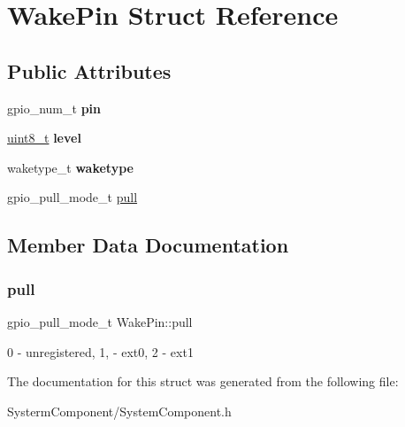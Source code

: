 \hypertarget{structWakePin}{}\section{Wake\+Pin Struct Reference}
\label{structWakePin}
\subsection*{Public Attributes}
\begin{DoxyCompactItemize}
\item 
\mbox{\label{structWakePin_a1af76a0ab77338fce4a69c1ba1365739}} 
gpio\+\_\+num\+\_\+t {\bfseries pin}
\item 
\mbox{\label{structWakePin_acfee5ab530988eb4c13a812d2c98a968}} 
\hyperlink{vl53l0x__types_8h_aba7bc1797add20fe3efdf37ced1182c5}{uint8\+\_\+t} {\bfseries level}
\item 
\mbox{\label{structWakePin_ac5afef53ea57070e598f036849669cb6}} 
waketype\+\_\+t {\bfseries waketype}
\item 
gpio\+\_\+pull\+\_\+mode\+\_\+t \hyperlink{structWakePin_a9b365c18b8bc9c58f1f00213f6663f67}{pull}
\end{DoxyCompactItemize}


\subsection{Member Data Documentation}
\mbox{\label{structWakePin_a9b365c18b8bc9c58f1f00213f6663f67}} 
\subsubsection{\texorpdfstring{pull}{pull}}
{\footnotesize\ttfamily gpio\+\_\+pull\+\_\+mode\+\_\+t Wake\+Pin\+::pull}

0 -\/ unregistered, 1, -\/ ext0, 2 -\/ ext1 

The documentation for this struct was generated from the following file\+:\begin{DoxyCompactItemize}
\item 
Systerm\+Component/System\+Component.\+h\end{DoxyCompactItemize}
